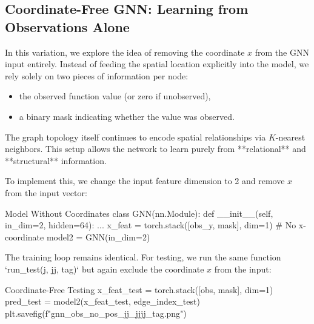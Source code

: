 \subsection{Coordinate-Free GNN: Learning from Observations Alone}

In this variation, we explore the idea of removing the coordinate $x$ from the GNN input entirely. Instead of feeding the spatial location explicitly into the model, we rely solely on two pieces of information per node:
\begin{itemize}
  \item the observed function value (or zero if unobserved),
  \item a binary mask indicating whether the value was observed.
\end{itemize}
The graph topology itself continues to encode spatial relationships via $K$-nearest neighbors. This setup allows the network to learn purely from **relational** and **structural** information.

\vspace{0.5em}
\noindent
To implement this, we change the input feature dimension to 2 and remove $x$ from the input vector:

\begin{codeonly}{Model Without Coordinates}
class GNN(nn.Module):
    def __init__(self, in_dim=2, hidden=64):
        ...
x_feat = torch.stack([obs_y, mask], dim=1)  # No x-coordinate
model2 = GNN(in_dim=2)
\end{codeonly}

\vspace{0.5em}
\noindent
The training loop remains identical. For testing, we run the same function `run\_test(j, jj, tag)` but again exclude the coordinate $x$ from the input:

\begin{codeonly}{Coordinate-Free Testing}
x_feat_test = torch.stack([obs, mask], dim=1)
pred_test = model2(x_feat_test, edge_index_test)
plt.savefig(f"gnn_obs_no_pos_j{j}_jj{jj}_{tag}.png")
\end{codeonly}


